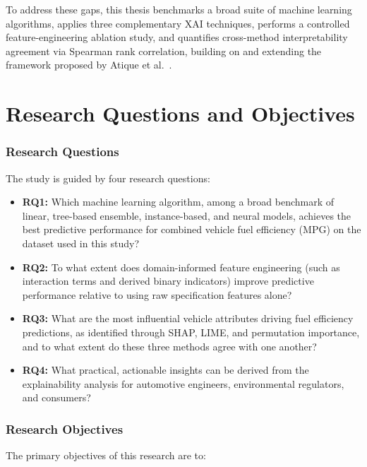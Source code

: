 To address these gaps, this thesis benchmarks a broad suite of machine learning algorithms, applies three complementary XAI techniques, performs a controlled feature-engineering ablation study, and quantifies cross-method interpretability agreement via Spearman rank correlation, building on and extending the framework proposed by Atique et al.~\cite{atique2026explainable}.

\section{Research Questions and Objectives}

\subsubsection{Research Questions}

The study is guided by four research questions:

\begin{itemize}
    \item \textbf{RQ1:} Which machine learning algorithm, among a broad benchmark of linear, tree-based ensemble, instance-based, and neural models, achieves the best predictive performance for combined vehicle fuel efficiency (MPG) on the dataset used in this study?

    \item \textbf{RQ2:} To what extent does domain-informed feature engineering (such as interaction terms and derived binary indicators) improve predictive performance relative to using raw specification features alone?

    \item \textbf{RQ3:} What are the most influential vehicle attributes driving fuel efficiency predictions, as identified through SHAP, LIME, and permutation importance, and to what extent do these three methods agree with one another?

    \item \textbf{RQ4:} What practical, actionable insights can be derived from the explainability analysis for automotive engineers, environmental regulators, and consumers?
\end{itemize}

\subsubsection{Research Objectives}

The primary objectives of this research are to:

